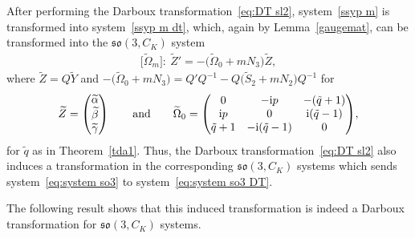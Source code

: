 \documentclass[10pt,a4paper]{amsart}
\numberwithin{equation}{section}
\begin{document}
After performing the Darboux transformation~\eqref{eq:DT sl2}, system~\eqref{ssyp m} is transformed into system~\eqref{ssyp m dt}, which, again by Lemma~\ref{gaugemat}, can be transformed into the $\mathfrak{so}(3, C_K)$ system
\begin{gather}\label{eq:system so3 DT}
 \big[\widetilde{\Omega}_m\big]\colon\ \widetilde{Z}' = - \big(\widetilde{\Omega}_0 + m N_3 \big) \widetilde{Z},
\end{gather}
where $\widetilde{Z}= Q \widetilde{Y}$ and $- \big(\widetilde{\Omega}_0 + m N_3 \big) = Q' Q^{-1} - Q \big(\widetilde{S}_2 + m N_2\big) Q^{-1} $ for
\begin{gather*}
\widetilde{Z}= \begin{pmatrix} \widetilde{\alpha} \\ \widetilde{\beta} \\ \widetilde{\gamma} \end{pmatrix}
\qquad \text{and} \qquad
\widetilde{\Omega}_0=
\begin{pmatrix}
0&-{\rm i}p&-(\tilde{q}+1)\\ {\rm i}p&0&{\rm i}(\tilde{q}-1) \\ \tilde{q}+1&-{\rm i}(\tilde{q}-1)&0
\end{pmatrix}\!,
\end{gather*}
for $\tilde{q}$ as in Theorem~\ref{tda1}.
Thus, the Darboux transformation~\eqref{eq:DT sl2} also induces a transformation in the corresponding $\mathfrak{so}(3, C_K)$ systems which sends system~\eqref{eq:system so3} to system~\eqref{eq:system so3 DT}.

The following result shows that this induced transformation is indeed a Darboux transformation for $\mathfrak{so}(3, C_K)$ systems.
\end{document}
